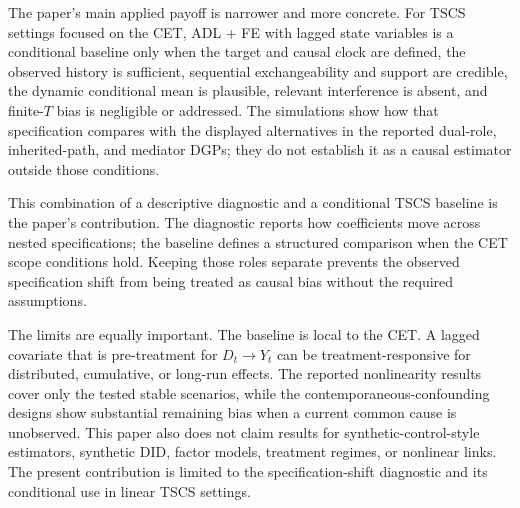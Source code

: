 \documentclass[
]{article}
\begin{document}
The paper's main applied payoff is narrower and more concrete. For TSCS
settings focused on the CET, ADL + FE with lagged state variables is a
conditional baseline only when the target and causal clock are defined,
the observed history is sufficient, sequential exchangeability and
support are credible, the dynamic conditional mean is plausible,
relevant interference is absent, and finite-\(T\) bias is negligible or
addressed. The simulations show how that specification compares with the
displayed alternatives in the reported dual-role, inherited-path, and
mediator DGPs; they do not establish it as a causal estimator outside
those conditions.

This combination of a descriptive diagnostic and a conditional TSCS
baseline is the paper's contribution. The diagnostic reports how
coefficients move across nested specifications; the baseline defines a
structured comparison when the CET scope conditions hold. Keeping those
roles separate prevents the observed specification shift from being
treated as causal bias without the required assumptions.

The limits are equally important. The baseline is local to the CET. A
lagged covariate that is pre-treatment for \(D_t \rightarrow Y_t\) can
be treatment-responsive for distributed, cumulative, or long-run
effects. The reported nonlinearity results cover only the tested stable
scenarios, while the contemporaneous-confounding designs show
substantial remaining bias when a current common cause is unobserved.
This paper also does not claim results for synthetic-control-style
estimators, synthetic DID, factor models, treatment regimes, or
nonlinear links. The present contribution is limited to the
specification-shift diagnostic and its conditional use in linear TSCS
settings.

\singlespacing


\end{document}
